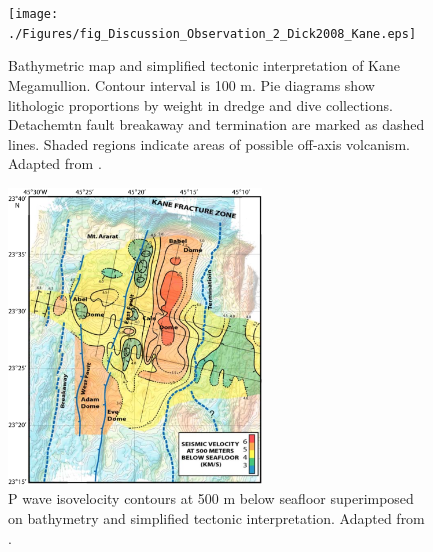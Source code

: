 \documentclass[draft,gc]{agutex}
\begin{document}
\begin{figure}[h]
\noindent\texttt{[image: ./Figures/fig\_Discussion\_Observation\_2\_Dick2008\_Kane.eps]}
 \caption[Bathymetric map and simplified tectonic interpretation of Kane Megamullion. Adapted from \citep{Dick2008}.]{Bathymetric map and simplified tectonic interpretation of Kane Megamullion. Contour interval is 100 m. Pie diagrams show lithologic proportions by weight in dredge and dive collections. Detachemtn fault breakaway and termination are marked as dashed lines. Shaded regions indicate areas of possible off-axis volcanism. Adapted from \citep{Dick2008}.}
 \label{fig_Discussion_Observation_2_Dick2008_Kane}
\end{figure}

\begin{figure}[h]
\noindent\includegraphics[width=0.6\textwidth]{./Figures/fig_Discussion_Observation_1_Xu2009_SeismicV_Kane.eps}
 \caption{P wave isovelocity contours at 500 m below seafloor superimposed on bathymetry and simplified tectonic interpretation. Adapted from \citep{Xu2009}.}
 \label{fig_Discussion_Observation_1_Xu2009_SeismicV_Kane}
\end{figure}
\end{document}
